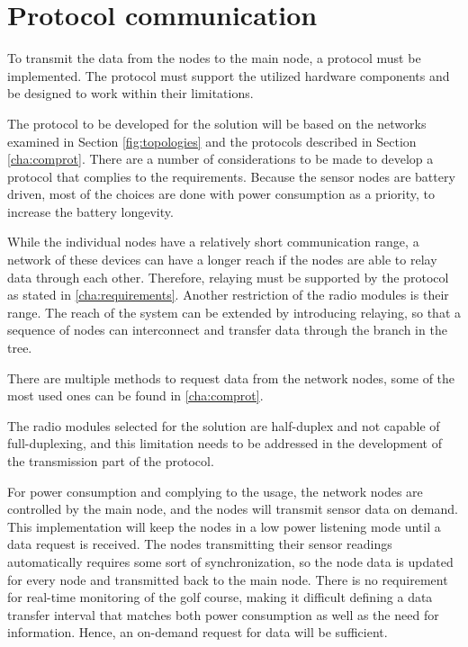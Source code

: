 \section{Protocol communication}\label{cha:protocolDesign}
To transmit the data from the nodes to the main node, a protocol must be implemented.
The protocol must support the utilized hardware components and be designed to work within their limitations. 

The protocol to be developed for the solution will be based on the networks examined in Section \ref{fig:topologies} and the protocols described in Section \ref{cha:comprot}.
There are a number of considerations to be made to develop a protocol that complies to the requirements.
Because the sensor nodes are battery driven, most of the choices are done with power consumption as a priority, to increase the battery longevity.

While the individual nodes have a relatively short communication range, a network of these devices can have a longer reach if the nodes are able to relay data through each other.
Therefore, relaying must be supported by the protocol as stated in \ref{cha:requirements}. 
Another restriction of the radio modules is their range. The reach of the system can be extended by introducing relaying, so that a sequence of nodes can interconnect and transfer data through the branch in the tree. 

There are multiple methods to request data from the network nodes, some of the most used ones can be found in \ref{cha:comprot}. 

The radio modules selected for the solution are half-duplex and not capable of full-duplexing, and this limitation needs to be addressed in the development of the transmission part of the protocol. 

For power consumption and complying to the usage, the network nodes are controlled by the main node, and the nodes will transmit sensor data on demand.
This implementation will keep the nodes in a low power listening mode until a data request is received.
The nodes transmitting their sensor readings automatically requires some sort of synchronization, so the node data is updated for every node and transmitted back to the main node.
There is no requirement for real-time monitoring of the golf course, making it difficult defining a data transfer interval that matches both power consumption as well as the need for information.
Hence, an on-demand request for data will be sufficient.


